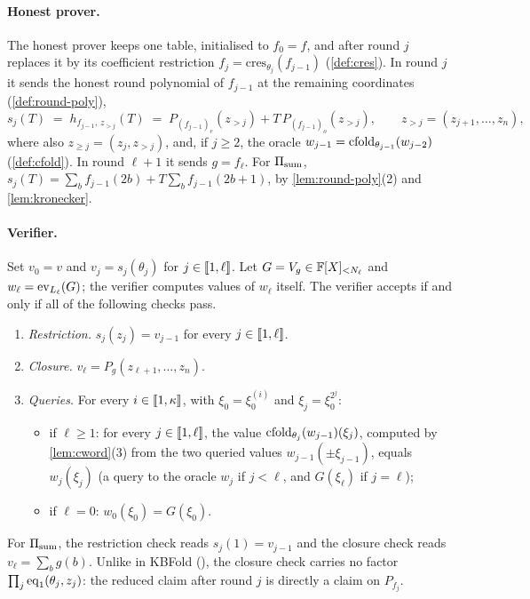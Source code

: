 \paragraph{Honest prover.}
The honest prover keeps one table, initialised to $f_0 = f$, and after round $j$ replaces it by its coefficient restriction $f_j = \mathrm{cres}_{\theta_j}(f_{j-1})$ (\cref{def:cres}).
In round $j$ it sends the honest round polynomial of $f_{j-1}$ at the remaining coordinates (\cref{def:round-poly}),
\begin{equation}\label{eq:honest-sj}
  s_j(T) \;=\; h_{f_{j-1},\, z_{>j}}(T) \;=\; P_{(f_{j-1})_e}(z_{>j}) + T\, P_{(f_{j-1})_o}(z_{>j}),
  \qquad z_{>j} = (z_{j+1},\dots,z_n),
\end{equation}
where also $z_{\ge j} = (z_j, z_{>j})$, and, if $j \ge 2$, the oracle $w_{j-1} = \mathrm{cfold}_{\theta_{j-1}}(w_{j-2})$ (\cref{def:cfold}).
In round $\ell + 1$ it sends $g = f_\ell$.
For $\Pi_{\mathrm{sum}}$, $s_j(T) = \sum_{b} f_{j-1}(2b) + T \sum_b f_{j-1}(2b+1)$, by \cref{lem:round-poly}(2) and \cref{lem:kronecker}.

\paragraph{Verifier.}
Set $v_0 = v$ and $v_j = s_j(\theta_j)$ for $j \in \llbracket 1, \ell \rrbracket$.
Let $G = V_g \in \mathbb{F}[X]_{<N_\ell}$ and $w_\ell = \mathrm{ev}_{L_\ell}(G)$; the verifier computes values of $w_\ell$ itself.
The verifier accepts if and only if all of the following checks pass.
\begin{enumerate}
  \item \emph{Restriction.} $s_j(z_j) = v_{j-1}$ for every $j \in \llbracket 1, \ell \rrbracket$.
  \item \emph{Closure.} $v_\ell = P_g(z_{\ell+1},\dots,z_n)$.
  \item \emph{Queries.} For every $i \in \llbracket 1, \kappa \rrbracket$, with $\xi_0 = \xi_0^{(i)}$ and $\xi_j = \xi_0^{2^j}$:
  \begin{itemize}
    \item if $\ell \ge 1$: for every $j \in \llbracket 1, \ell \rrbracket$, the value $\mathrm{cfold}_{\theta_j}(w_{j-1})(\xi_j)$, computed by \cref{lem:cword}(3) from the two queried values $w_{j-1}(\pm\xi_{j-1})$, equals $w_j(\xi_j)$ (a query to the oracle $w_j$ if $j < \ell$, and $G(\xi_\ell)$ if $j = \ell$);
    \item if $\ell = 0$: $w_0(\xi_0) = G(\xi_0)$.
  \end{itemize}
\end{enumerate}
For $\Pi_{\mathrm{sum}}$, the restriction check reads $s_j(1) = v_{j-1}$ and the closure check reads $v_\ell = \sum_b g(b)$.
Unlike in KBFold (), the closure check carries no factor $\prod_j \mathrm{eq}_1(\theta_j, z_j)$: the reduced claim after round $j$ is directly a claim on $P_{f_j}$.

